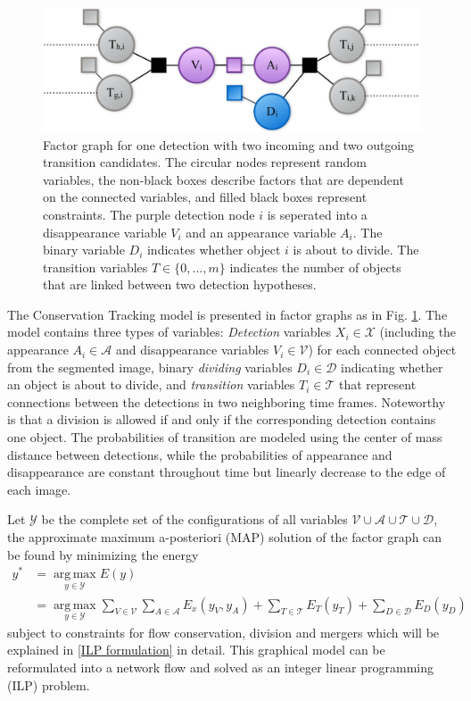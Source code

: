 \documentclass[10pt,twocolumn,letterpaper]{article}
\begin{document}
\begin{figure}[b]
\begin{center}
\centering\includegraphics[width=0.8\linewidth]{model.jpeg}
\end{center}
   \caption{Factor graph for one detection with two incoming and two outgoing transition candidates. The circular nodes represent random variables, the non-black boxes describe factors that are dependent on the connected variables, and filled black boxes represent constraints. The purple detection node $i$ is seperated into a disappearance variable $V_i$ and an appearance variable $A_i$. The binary variable $D_i$ indicates whether object $i$ is about to divide. The transition variables $T \in \{0,...,m\}$ indicates the number of objects that are linked between two detection hypotheses.}
\label{fig:ctmodel}
\end{figure}

The Conservation Tracking model is presented in factor graphs as in Fig. \ref{fig:ctmodel}. The model contains three types of variables: \textit{Detection} variables $X_i \in \mathcal{X}$ (including the appearance $A_i \in \mathcal{A}$ and disappearance variables $V_i \in \mathcal{V}$) for each connected object from the segmented image, binary \textit{dividing} variables $D_i \in \mathcal{D}$ indicating whether an object is about to divide, and \textit{transition} variables $T_i \in \mathcal{T}$ that represent connections between the detections in two neighboring time frames. Noteworthy is that a division is allowed if and only if the corresponding detection contains one object. The probabilities of transition are modeled using the center of mass distance between detections, while the probabilities of appearance and disappearance are constant throughout time but linearly decrease to the edge of each image.

Let $\mathcal{Y}$ be the complete set of the configurations of all variables $\mathcal{V}\cup\mathcal{A}\cup\mathcal{T}\cup\mathcal{D}$, the approximate maximum a-posteriori (MAP) solution of the factor graph can be found by minimizing the energy
\scriptsize
\begin{equation*}
\begin{split}
 y^* &= \operatorname*{arg\,max}_{y\in\mathcal{Y}} E(y) \\ 
     &= \operatorname*{arg\,max}_{y\in\mathcal{Y}} \sum\limits_{V\in\mathcal{V}}\sum\limits_{A\in\mathcal{A}} E_x(y_V, y_A) + \sum\limits_{T\in\mathcal{T}} E_T(y_T) + \sum\limits_{D\in\mathcal{D}} E_D(y_D)
\end{split}
\end{equation*}
\normalsize
subject to constraints for flow conservation, division and mergers which will be explained in \ref{ILP formulation} in detail. This graphical model can be reformulated into a network flow and solved as an integer linear programming (ILP) problem.
\end{document}
